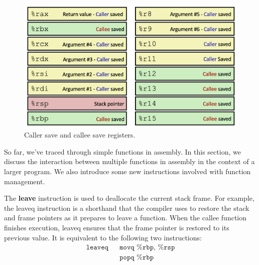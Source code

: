 \documentclass{article}
\begin{document}
      \begin{figure}[H]
        \centering 
        \includegraphics[scale=0.4]{img/caller_callee_save.png}
        \caption{Caller save and callee save registers. } 
        \label{fig:caller_callee_save}
      \end{figure}

      So far, we've traced through simple functions in assembly. In this section, we discuss the interaction between multiple functions in assembly in the context of a larger program. We also introduce some new instructions involved with function management. 

      \begin{definition}[Leave]
        The \textbf{leave} instruction is used to deallocate the current stack frame. For example, the leaveq instruction is a shorthand that the compiler uses to restore the stack and frame pointers as it prepares to leave a function. When the callee function finishes execution, leaveq ensures that the frame pointer is restored to its previous value. It is equivalent to the following two instructions: 
        \begin{align*}
          \texttt{leaveq} && \texttt{movq \%rbp, \%rsp} \\
                          && \texttt{popq \%rbp}
        \end{align*}
      \end{definition}
    
\end{document}

